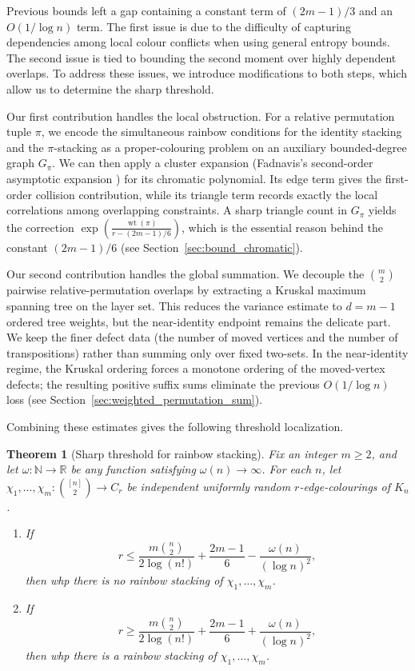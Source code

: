 \documentclass[10pt,a4paper]{amsart}
\newtheorem{theorem}{Theorem}[section]
\newcommand\N{\mathbb{N}}
\renewcommand\le{\leqslant}
\renewcommand\ge{\geqslant}
\renewcommand\to{\rightarrow}
\def\R{\mathbb{R}}
\newcommand{\wt}{\operatorname{wt}}
\begin{document}
Previous bounds left a gap containing a constant term of $(2m-1)/3$ and an $O(1/\log n)$ term. The first issue is due to the difficulty of capturing dependencies among local colour conflicts when using general entropy bounds. The second issue is tied to bounding the second moment over highly dependent overlaps. To address these issues, we introduce modifications to both steps, which allow us to determine the sharp threshold.

Our first contribution handles the local obstruction. For a relative permutation tuple $\pi$, we encode the simultaneous rainbow conditions for the identity stacking and the $\pi$-stacking as a proper-colouring problem on an auxiliary bounded-degree graph $G_\pi$.  We can then apply a cluster expansion (Fadnavis's second-order asymptotic expansion \cite{Fadnavis}) for its chromatic polynomial. Its edge term gives the first-order collision contribution, while its triangle term records exactly the local correlations among overlapping constraints. A sharp triangle count in $G_\pi$ yields the correction $\exp\left(\frac{\wt(\pi)}{r-(2m-1)/6}\right)$,
which is the essential reason behind the constant $(2m-1)/6$ (see Section~\ref{sec:bound_chromatic}).

Our second contribution handles the global summation.  We decouple the $\binom m2$ pairwise relative-permutation overlaps by extracting a Kruskal maximum spanning tree on the layer set.  This reduces the variance estimate to $d=m-1$ ordered tree weights, but the near-identity endpoint remains the delicate part.  We keep the finer defect data (the number of moved vertices and the number of transpositions) rather than summing only over fixed two-sets.  In the near-identity regime, the Kruskal ordering forces a monotone ordering of the moved-vertex defects; the resulting positive suffix sums eliminate the previous $O(1/\log n)$ loss (see Section~\ref{sec:weighted_permutation_sum}). 

Combining these estimates gives the following threshold localization.


\begin{theorem}[Sharp threshold for rainbow stacking] \label{thm:main_stacking}
Fix an integer $m \ge 2$, and let $\omega:\N \to \R$ be any function satisfying $\omega(n)\to\infty$. For each $n$, let
$\chi_{1},\dots,\chi_{m} : \binom{[n]}{2} \to C_r$
be independent uniformly random $r$-edge-colourings of $K_{n}$.
\begin{enumerate}
    \item[\rm (a)] If 
    \[ r \le \frac{m\binom{n}{2}}{2\log(n!)} + \frac{2m-1}{6} - \frac{\omega(n)}{(\log n)^{2}}, \]
    then whp there is no rainbow stacking of $\chi_{1},\dots,\chi_{m}$.
    
    \item[\rm (b)] If 
    \[ r \ge \frac{m\binom{n}{2}}{2\log(n!)} + \frac{2m-1}{6} + \frac{\omega(n)}{(\log n)^{2}}, \]
    then whp there is a rainbow stacking of $\chi_{1},\dots,\chi_{m}$.  
\end{enumerate}
\end{theorem}
\end{document}
